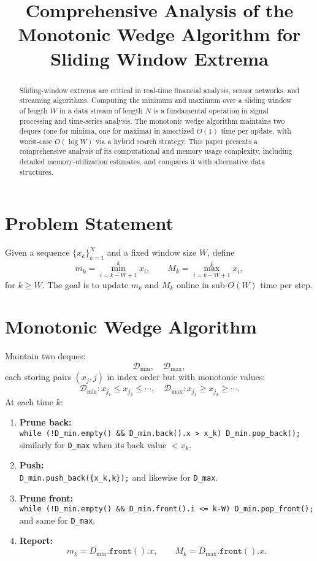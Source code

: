 \documentclass[12pt,letterpaper]{article}
\title{Comprehensive Analysis of the Monotonic Wedge Algorithm for Sliding Window Extrema}
\date{}
\begin{document}
\maketitle

\begin{abstract}
Sliding‐window extrema are critical in real‐time financial analysis, sensor networks, and streaming algorithms.  Computing the minimum and maximum over a sliding window of length \(W\) in a data stream of length \(N\) is a fundamental operation in signal processing and time‐series analysis.  The monotonic wedge algorithm maintains two deques (one for minima, one for maxima) in amortized \(O(1)\) time per update, with worst‐case \(O(\log W)\) via a hybrid search strategy.  This paper presents a comprehensive analysis of its computational and memory usage complexity, including detailed memory‐utilization estimates, and compares it with alternative data structures.
\end{abstract}

\section{Problem Statement}
Given a sequence \(\{x_k\}_{k=1}^N\) and a fixed window size \(W\), define
\[
  m_k = \min_{i=k-W+1}^k x_i,\qquad
  M_k = \max_{i=k-W+1}^k x_i,
\]
for \(k \ge W\).  The goal is to update \(m_k\) and \(M_k\) online in sub-\(O(W)\) time per step.

\section{Monotonic Wedge Algorithm}
Maintain two deques:
\[
  \mathcal{D}_{\min},\quad \mathcal{D}_{\max},
\]
each storing pairs \((x_j,j)\) in index order but with monotonic values:
\[
  \mathcal{D}_{\min}\colon x_{j_1}\le x_{j_2}\le\cdots,\quad
  \mathcal{D}_{\max}\colon x_{j_1}\ge x_{j_2}\ge\cdots.
\]
At each time \(k\):
\begin{enumerate}
  \item \textbf{Prune back:}\\
    \texttt{while\,(!D\_min.empty() \&\& D\_min.back().x > x\_k) D\_min.pop\_back();}\\
    similarly for \texttt{D\_max} when its back value \(<x_k\).
  \item \textbf{Push:}\\
    \texttt{D\_min.push\_back(\{x\_k,k\});} and likewise for \texttt{D\_max}.
  \item \textbf{Prune front:}\\
    \texttt{while\,(!D\_min.empty() \&\& D\_min.front().i <= k-W) D\_min.pop\_front();}\\
    and same for \texttt{D\_max}.
  \item \textbf{Report:}\\
    \[
      m_k = D_{\min}.\texttt{front}().x,\qquad
      M_k = D_{\max}.\texttt{front}().x.
    \]
\end{enumerate}
\end{document}
